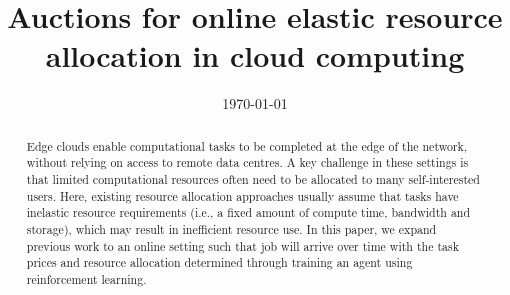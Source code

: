 \documentclass[sotoncolour]{extra/uosproject}     %
\title       {Auctions for online elastic resource allocation in cloud computing}
\date       {\today}
\begin{document}
\frontmatter
\maketitle
\begin{abstract}
Edge clouds enable computational tasks to be completed at the edge of the network, without relying on access to remote data centres. A key challenge in these settings is that limited computational resources often need to be allocated to many self-interested users. Here, existing resource allocation approaches usually assume that tasks have inelastic resource requirements (i.e., a fixed amount of compute time, bandwidth and storage), which may result in inefficient resource use. In this paper, we expand previous work to an online setting such that job will arrive over time with the task prices and resource allocation determined through training an agent using reinforcement learning.  
\end{abstract}
\tableofcontents

\end{document}
